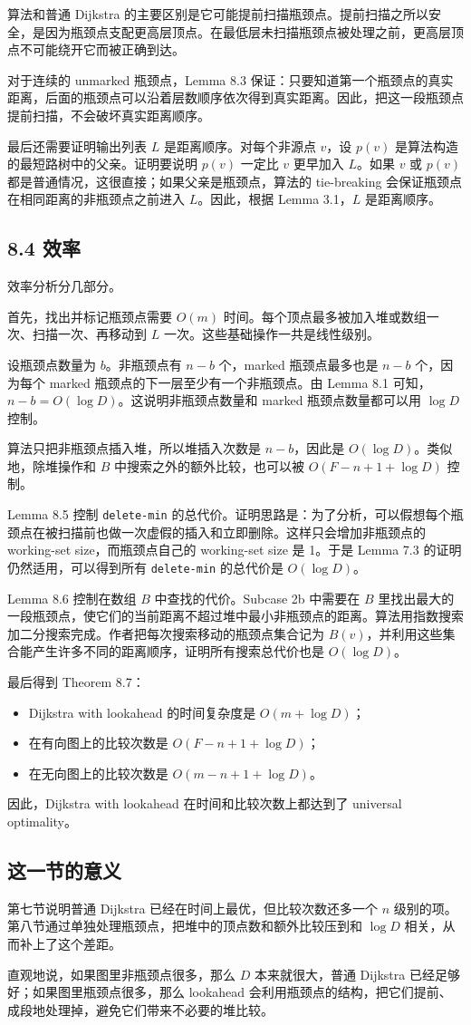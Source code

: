 \documentclass[UTF8]{ctexart}
\begin{document}
算法和普通 Dijkstra 的主要区别是它可能提前扫描瓶颈点。提前扫描之所以安全，是因为瓶颈点支配更高层顶点。在最低层未扫描瓶颈点被处理之前，更高层顶点不可能绕开它而被正确到达。

对于连续的 unmarked 瓶颈点，Lemma 8.3 保证：只要知道第一个瓶颈点的真实距离，后面的瓶颈点可以沿着层数顺序依次得到真实距离。因此，把这一段瓶颈点提前扫描，不会破坏真实距离顺序。

最后还需要证明输出列表 \(L\) 是距离顺序。对每个非源点 \(v\)，设 \(p(v)\) 是算法构造的最短路树中的父亲。证明要说明 \(p(v)\) 一定比 \(v\) 更早加入 \(L\)。如果 \(v\) 或 \(p(v)\) 都是普通情况，这很直接；如果父亲是瓶颈点，算法的 tie-breaking 会保证瓶颈点在相同距离的非瓶颈点之前进入 \(L\)。因此，根据 Lemma 3.1，\(L\) 是距离顺序。

\subsection*{8.4 效率}

效率分析分几部分。

首先，找出并标记瓶颈点需要 \(O(m)\) 时间。每个顶点最多被加入堆或数组一次、扫描一次、再移动到 \(L\) 一次。这些基础操作一共是线性级别。

设瓶颈点数量为 \(b\)。非瓶颈点有 \(n-b\) 个，marked 瓶颈点最多也是 \(n-b\) 个，因为每个 marked 瓶颈点的下一层至少有一个非瓶颈点。由 Lemma 8.1 可知，\(n-b=O(\log D)\)。这说明非瓶颈点数量和 marked 瓶颈点数量都可以用 \(\log D\) 控制。

算法只把非瓶颈点插入堆，所以堆插入次数是 \(n-b\)，因此是 \(O(\log D)\)。类似地，除堆操作和 \(B\) 中搜索之外的额外比较，也可以被 \(O(F-n+1+\log D)\) 控制。

Lemma 8.5 控制 \texttt{delete-min} 的总代价。证明思路是：为了分析，可以假想每个瓶颈点在被扫描前也做一次虚假的插入和立即删除。这样只会增加非瓶颈点的 working-set size，而瓶颈点自己的 working-set size 是 1。于是 Lemma 7.3 的证明仍然适用，可以得到所有 \texttt{delete-min} 的总代价是 \(O(\log D)\)。

Lemma 8.6 控制在数组 \(B\) 中查找的代价。Subcase 2b 中需要在 \(B\) 里找出最大的一段瓶颈点，使它们的当前距离不超过堆中最小非瓶颈点的距离。算法用指数搜索加二分搜索完成。作者把每次搜索移动的瓶颈点集合记为 \(B(v)\)，并利用这些集合能产生许多不同的距离顺序，证明所有搜索总代价也是 \(O(\log D)\)。

最后得到 Theorem 8.7：

\begin{itemize}
  \item Dijkstra with lookahead 的时间复杂度是 \(O(m+\log D)\)；
  \item 在有向图上的比较次数是 \(O(F-n+1+\log D)\)；
  \item 在无向图上的比较次数是 \(O(m-n+1+\log D)\)。
\end{itemize}

因此，Dijkstra with lookahead 在时间和比较次数上都达到了 universal optimality。

\subsection*{这一节的意义}

第七节说明普通 Dijkstra 已经在时间上最优，但比较次数还多一个 \(n\) 级别的项。第八节通过单独处理瓶颈点，把堆中的顶点数和额外比较压到和 \(\log D\) 相关，从而补上了这个差距。

直观地说，如果图里非瓶颈点很多，那么 \(D\) 本来就很大，普通 Dijkstra 已经足够好；如果图里瓶颈点很多，那么 lookahead 会利用瓶颈点的结构，把它们提前、成段地处理掉，避免它们带来不必要的堆比较。
\end{document}
